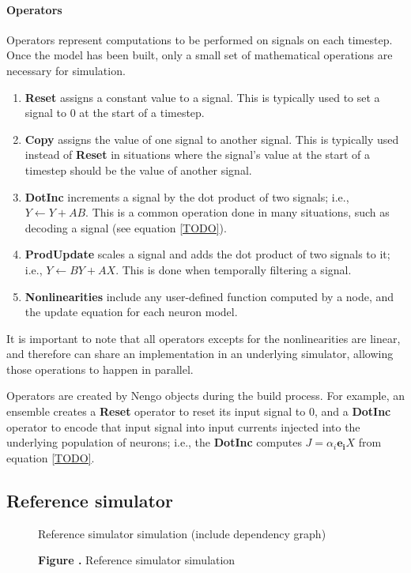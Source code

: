 \documentclass{frontiersSCNS}
\begin{document}
\paragraph{Operators}
Operators represent computations
to be performed on signals on each timestep.
Once the model has been built,
only a small set of mathematical
operations are necessary for simulation.
\begin{enumerate}
  \item \textbf{Reset} assigns a constant value to a signal.
    This is typically used to set a signal to 0
    at the start of a timestep.
  \item \textbf{Copy} assigns the value
    of one signal to another signal.
    This is typically used instead of \textbf{Reset}
    in situations where the signal's value
    at the start of a timestep should
    be the value of another signal.
  \item \textbf{DotInc} increments a signal by
    the dot product of two signals;
    i.e., $Y \leftarrow Y + AB$.
    This is a common operation
    done in many situations,
    such as decoding a signal (see equation \eqref{TODO}).
  \item \textbf{ProdUpdate} scales a signal
    and adds the dot product of two signals to it;
    i.e., $Y \leftarrow BY + AX$.
    This is done when temporally filtering a signal.
  \item \textbf{Nonlinearities} include any
    user-defined function computed by a node,
    and the update equation for each neuron model.
\end{enumerate}

It is important to note that all operators
excepts for the nonlinearities are linear,
and therefore can share an implementation
in an underlying simulator,
allowing those operations to happen in parallel.

Operators are created
by Nengo objects during the build process.
For example, an ensemble creates
a \textbf{Reset} operator to reset
its input signal to 0,
and a \textbf{DotInc} operator
to encode that input signal into
input currents injected into
the underlying population of neurons;
i.e., the \textbf{DotInc} computes
$J = \alpha_i \mathbf{e_i} X$ from equation \eqref{TODO}.

\subsection{Reference simulator}

\begin{figure}
\begin{center}
  Reference simulator simulation (include dependency graph)
\end{center}
 \textbf{\label{fig:01} Figure .}{
   Reference simulator simulation}
\end{figure}
\end{document}
